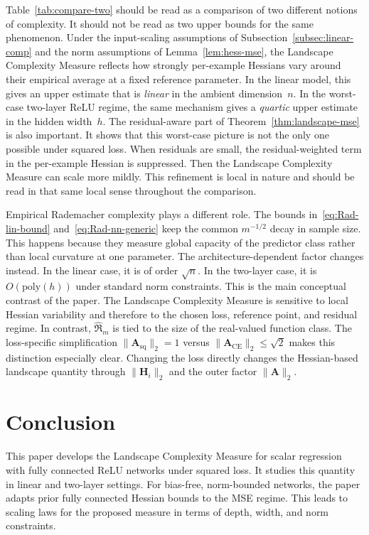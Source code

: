 \documentclass[10pt,letterpaper]{article}
\theoremstyle{definition}
\begin{document}
Table~\ref{tab:compare-two} should be read as a comparison of two different notions of complexity. It should not be read as two upper bounds for the same phenomenon. Under the input-scaling assumptions of Subsection~\ref{subsec:linear-comp} and the norm assumptions of Lemma~\ref{lem:hess-mse}, the Landscape Complexity Measure reflects how strongly per-example Hessians vary around their empirical average at a fixed reference parameter. In the linear model, this gives an upper estimate that is \emph{linear} in the ambient dimension~$n$. In the worst-case two-layer ReLU regime, the same mechanism gives a \emph{quartic} upper estimate in the hidden width~$h$. The residual-aware part of Theorem~\ref{thm:landscape-mse} is also important. It shows that this worst-case picture is not the only one possible under squared loss. When residuals are small, the residual-weighted term in the per-example Hessian is suppressed. Then the Landscape Complexity Measure can scale more mildly. This refinement is local in nature and should be read in that same local sense throughout the comparison.

Empirical Rademacher complexity plays a different role. The bounds in~\eqref{eq:Rad-lin-bound} and~\eqref{eq:Rad-nn-generic} keep the common $m^{-1/2}$ decay in sample size. This happens because they measure global capacity of the predictor class rather than local curvature at one parameter. The architecture-dependent factor changes instead. In the linear case, it is of order $\sqrt{n}$. In the two-layer case, it is $O(\mathrm{poly}(h))$ under standard norm constraints. This is the main conceptual contrast of the paper. The Landscape Complexity Measure is sensitive to local Hessian variability and therefore to the chosen loss, reference point, and residual regime. In contrast, $\hat{\mathfrak{R}}_m$ is tied to the size of the real-valued function class. The loss-specific simplification $\|\mathbf{A}_{\mathrm{sq}}\|_2=1$ versus $\|\mathbf{A}_{\mathrm{CE}}\|_2\le\sqrt{2}$ makes this distinction especially clear. Changing the loss directly changes the Hessian-based landscape quantity through $\|\mathbf{H}_i\|_2$ and the outer factor $\|\mathbf{A}\|_2$.

\section{Conclusion}\label{sec:conclusion}

This paper develops the Landscape Complexity Measure for scalar regression with fully connected ReLU networks under squared loss. It studies this quantity in linear and two-layer settings. For bias-free, norm-bounded networks, the paper adapts prior fully connected Hessian bounds to the MSE regime. This leads to scaling laws for the proposed measure in terms of depth, width, and norm constraints.
\end{document}
